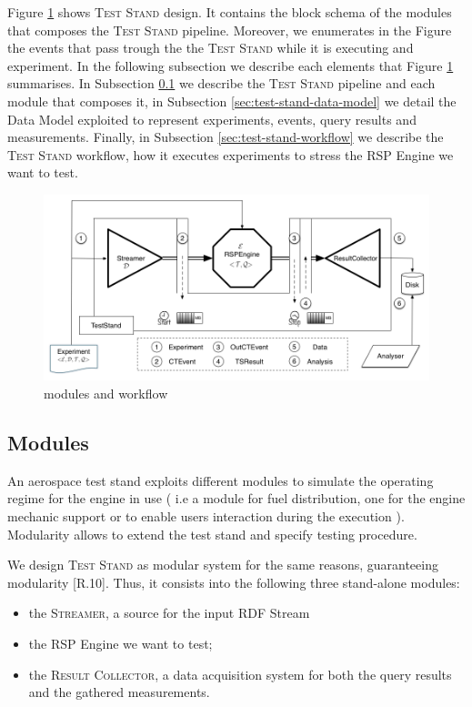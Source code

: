 Figure \ref{fig:architecture} shows \name \textsc{Test Stand} design. It contains the block schema of the modules that composes the \textsc{Test Stand} pipeline. Moreover, we enumerates in the Figure the events that pass trough the the \textsc{Test Stand} while it is executing and experiment. In the following subsection we describe each elements that Figure \ref{fig:architecture} summarises. In Subsection \ref{sec:modules} we describe the \textsc{Test Stand} pipeline and each module that composes it, in Subsection \ref{sec:test-stand-data-model} we detail the Data Model exploited to represent experiments, events, query results and measurements. Finally, in Subsection \ref{sec:test-stand-workflow} we describe the \textsc{Test Stand} workflow, how it executes experiments to stress the RSP Engine we want to test.

\begin{figure}[tbh]
\centering
\includegraphics[scale=0.37]{images/schema2}
\caption{\name modules and workflow} 
\label{fig:architecture}
\end{figure}


\subsection{Modules}\label{sec:modules}

\noindent An aerospace test stand exploits different modules to simulate the operating regime for the engine in use ( i.e a module for fuel distribution, one for the engine mechanic support or to enable users interaction during the execution ). Modularity allows to extend the test stand and specify testing procedure. 

We design \name \textsc{Test Stand} as modular system for the same reasons, guaranteeing modularity [R.10]. Thus, it consists into the following three stand-alone modules:
\begin{itemize}
\item the \textsc{Streamer}, a source for the input RDF Stream
\item the RSP Engine we want to test;
\item the \textsc{Result Collector}, a data acquisition system for both the query results and the gathered measurements.
\end{itemize}

